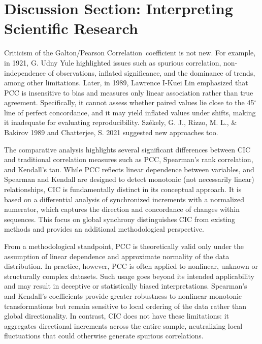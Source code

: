 \documentclass[sts]{imsart}
\newcommand{\cic}{\text{CIC}}
\newcommand{\pcc}{\text{PCC}}
\newcommand{\pccFull}{\textnormal{Galton/Pearson Correlation}}
\begin{document}
\section{Discussion Section: Interpreting Scientific Research}

Criticism of the \pccFull\ coefficient is not new. For example, in 1921, G. Udny Yule \cite{r1} highlighted issues such as spurious correlation, non-independence of observations, inflated significance, and the dominance of trends, among other limitations. Later, in 1989, Lawrence I-Kuei Lin \cite{r2} emphasized that $\pcc$ is insensitive to bias and measures only linear association rather than true agreement. Specifically, it cannot assess whether paired values lie close to the 45$^\circ$ line of perfect concordance, and it may yield inflated values under shifts, making it inadequate for evaluating reproducibility. Sz\'ekely, G. J., Rizzo, M. L., \& Bakirov 1989 \cite{r4} and Chatterjee, S. 2021 \cite{r5} suggested new approaches too. 

The comparative analysis highlights several significant differences between $\cic$ and traditional correlation measures such as $\pcc$, Spearman’s rank correlation, and Kendall’s tau. While $\pcc$ reflects linear dependence between variables, and Spearman and Kendall are designed to detect monotonic (not necessarily linear) relationships, $\cic$ is fundamentally distinct in its conceptual approach. It is based on a differential analysis of synchronized increments with a normalized numerator, which captures the direction and concordance of changes within sequences. This focus on global synchrony distinguishes $\cic$ from existing methods and provides an additional methodological perspective.

From a methodological standpoint, $\pcc$ is theoretically valid only under the assumption of linear dependence and approximate normality of the data distribution. In practice, however, $\pcc$ is often applied to nonlinear, unknown or structurally complex datasets. Such usage goes beyond its intended applicability and may result in deceptive or statistically biased interpretations. Spearman’s and Kendall’s coefficients provide greater robustness to nonlinear monotonic transformations but remain sensitive to local ordering of the data rather than global directionality. In contrast, $\cic$ does not have these limitations: it aggregates directional increments across the entire sample, neutralizing local fluctuations that could otherwise generate spurious correlations.
\end{document}
